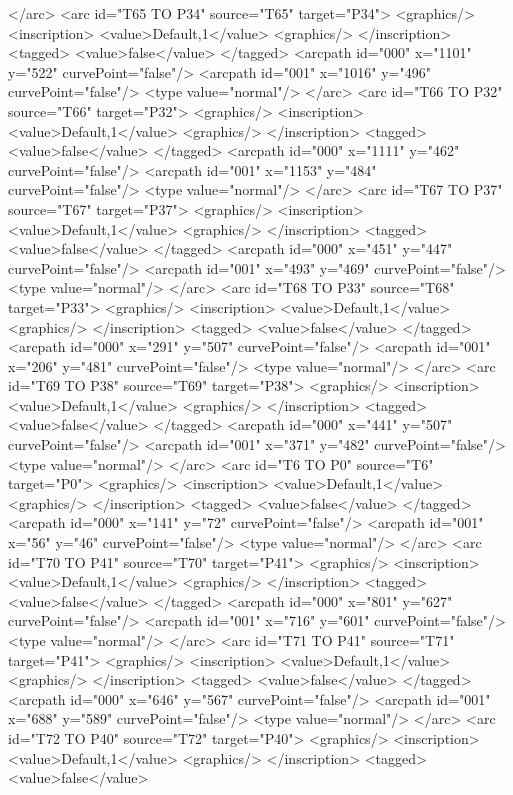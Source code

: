 </arc>
<arc id="T65 TO P34" source="T65" target="P34">
<graphics/>
<inscription>
<value>Default,1</value>
<graphics/>
</inscription>
<tagged>
<value>false</value>
</tagged>
<arcpath id="000" x="1101" y="522" curvePoint="false"/>
<arcpath id="001" x="1016" y="496" curvePoint="false"/>
<type value="normal"/>
</arc>
<arc id="T66 TO P32" source="T66" target="P32">
<graphics/>
<inscription>
<value>Default,1</value>
<graphics/>
</inscription>
<tagged>
<value>false</value>
</tagged>
<arcpath id="000" x="1111" y="462" curvePoint="false"/>
<arcpath id="001" x="1153" y="484" curvePoint="false"/>
<type value="normal"/>
</arc>
<arc id="T67 TO P37" source="T67" target="P37">
<graphics/>
<inscription>
<value>Default,1</value>
<graphics/>
</inscription>
<tagged>
<value>false</value>
</tagged>
<arcpath id="000" x="451" y="447" curvePoint="false"/>
<arcpath id="001" x="493" y="469" curvePoint="false"/>
<type value="normal"/>
</arc>
<arc id="T68 TO P33" source="T68" target="P33">
<graphics/>
<inscription>
<value>Default,1</value>
<graphics/>
</inscription>
<tagged>
<value>false</value>
</tagged>
<arcpath id="000" x="291" y="507" curvePoint="false"/>
<arcpath id="001" x="206" y="481" curvePoint="false"/>
<type value="normal"/>
</arc>
<arc id="T69 TO P38" source="T69" target="P38">
<graphics/>
<inscription>
<value>Default,1</value>
<graphics/>
</inscription>
<tagged>
<value>false</value>
</tagged>
<arcpath id="000" x="441" y="507" curvePoint="false"/>
<arcpath id="001" x="371" y="482" curvePoint="false"/>
<type value="normal"/>
</arc>
<arc id="T6 TO P0" source="T6" target="P0">
<graphics/>
<inscription>
<value>Default,1</value>
<graphics/>
</inscription>
<tagged>
<value>false</value>
</tagged>
<arcpath id="000" x="141" y="72" curvePoint="false"/>
<arcpath id="001" x="56" y="46" curvePoint="false"/>
<type value="normal"/>
</arc>
<arc id="T70 TO P41" source="T70" target="P41">
<graphics/>
<inscription>
<value>Default,1</value>
<graphics/>
</inscription>
<tagged>
<value>false</value>
</tagged>
<arcpath id="000" x="801" y="627" curvePoint="false"/>
<arcpath id="001" x="716" y="601" curvePoint="false"/>
<type value="normal"/>
</arc>
<arc id="T71 TO P41" source="T71" target="P41">
<graphics/>
<inscription>
<value>Default,1</value>
<graphics/>
</inscription>
<tagged>
<value>false</value>
</tagged>
<arcpath id="000" x="646" y="567" curvePoint="false"/>
<arcpath id="001" x="688" y="589" curvePoint="false"/>
<type value="normal"/>
</arc>
<arc id="T72 TO P40" source="T72" target="P40">
<graphics/>
<inscription>
<value>Default,1</value>
<graphics/>
</inscription>
<tagged>
<value>false</value>
